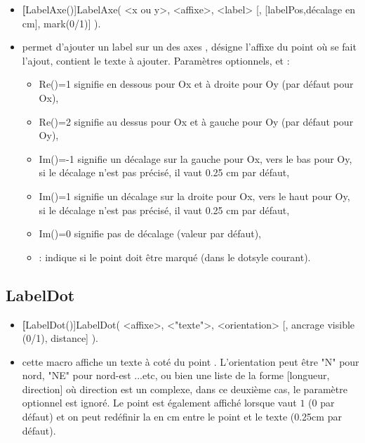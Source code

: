 \begin{itemize}
 \item \util \textbf[LabelAxe()]{LabelAxe( <x ou y>, <affixe>, <label> [, [labelPos,décalage en cm], mark(0/1)] )}.
 \item \desc permet d'ajouter un label sur un des axes ,  désigne l'affixe du point où se fait l'ajout,  contient le texte à ajouter. Paramètres optionnels,  et :
  \begin{itemize}
  \item Re()=1 signifie en dessous pour Ox et à droite pour Oy (par défaut pour Ox),
  \item Re()=2 signifie au dessus pour Ox et à gauche pour Oy (par défaut pour Oy),
  \item Im()=-1 signifie un décalage sur la gauche pour Ox, vers le bas pour Oy, si le décalage n'est pas précisé, il vaut 0.25 cm par défaut,
  \item Im()=1 signifie un décalage sur la droite pour Ox, vers le haut pour Oy, si le décalage n'est pas précisé, il vaut 0.25 cm par défaut,
  \item Im()=0 signifie pas de décalage (valeur par défaut),
  \item {}: indique si le point doit être marqué (dans le dotsyle courant).
  \end{itemize}
\end{itemize}

\subsection{LabelDot}\label{macLabelDot}

\begin{itemize}
 \item \util \textbf[LabelDot()]{LabelDot( <affixe>, <"texte">, <orientation> [, ancrage visible (0/1), distance] )}.
 \item \desc cette macro affiche un texte à coté du point . L'orientation peut être "N" pour nord, "NE" pour nord-est ...etc, ou bien une liste de la forme [longueur, direction] où direction est un complexe, dans ce deuxième cas, le paramètre optionnel  est ignoré. Le point est également affiché lorsque  vaut $1$ (0 par défaut) et on peut redéfinir la  en cm entre le point et le texte (0.25cm par défaut).
\end{itemize}

